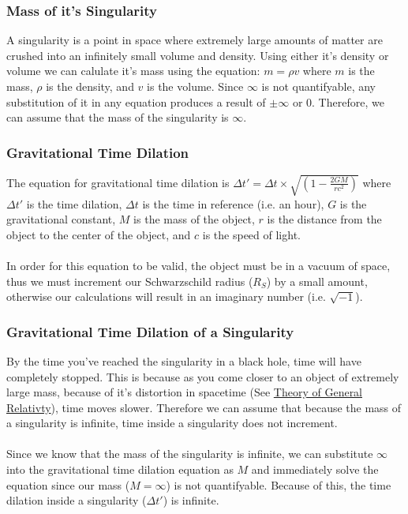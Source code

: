 \documentclass{article}
\begin{document}
\subsubsection{Mass of it's Singularity}
A singularity is a point in space where extremely large amounts of matter are crushed into an infinitely small volume and density. Using either it's density or volume we can calulate it's mass using the equation: $m = \rho v$ where $m$ is the mass, $\rho$ is the density, and $v$ is the volume. Since $\infty$ is not quantifyable, any substitution of it in any equation produces a result of $\pm \infty$ or 0. Therefore, we can assume that the mass of the singularity is $\infty$.

\subsubsection{Gravitational Time Dilation}
The equation for gravitational time dilation is $\Delta t\prime = \Delta t\times\sqrt{(1-\frac{2GM}{rc^2})}$ where $\Delta t\prime$ is the time dilation, $\Delta t$ is the time in reference (i.e. an hour), $G$ is the gravitational constant, $M$ is the mass of the object, $r$ is the distance from the object to the center of the object, and $c$ is the speed of light.\\\\
In order for this equation to be valid, the object must be in a vacuum of space, thus we must increment our Schwarzschild radius ($R_{S}$) by a small amount, otherwise our calculations will result in an imaginary number (i.e. $\sqrt{-1}$).

\subsubsection{Gravitational Time Dilation of a Singularity}
By the time you've reached the singularity in a black hole, time will have completely stopped. This is because as you come closer to an object of extremely large mass, because of it's distortion in spacetime (See \hyperref[sec:generalrelativity]{Theory of General Relativty}), time moves slower. Therefore we can assume that because the mass of a singularity is infinite, time inside a singularity does not increment. \\\\
Since we know that the mass of the singularity is infinite, we can substitute $\infty$ into the gravitational time dilation equation as $M$ and immediately solve the equation since our mass ($M = \infty$) is not quantifyable. Because of this, the time dilation inside a singularity ($\Delta t\prime$) is infinite.
\end{document}
